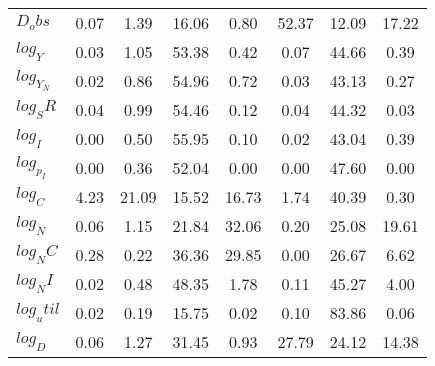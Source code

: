 \begin{center}
\begin{longtable}{lccccccc}
$D_obs     $	 & 	        0.07	 & 	        1.39	 & 	       16.06	 & 	        0.80	 & 	       52.37	 & 	       12.09	 & 	       17.22 \\ 
$log_Y     $	 & 	        0.03	 & 	        1.05	 & 	       53.38	 & 	        0.42	 & 	        0.07	 & 	       44.66	 & 	        0.39 \\ 
$log_Y_N   $	 & 	        0.02	 & 	        0.86	 & 	       54.96	 & 	        0.72	 & 	        0.03	 & 	       43.13	 & 	        0.27 \\ 
$log_SR    $	 & 	        0.04	 & 	        0.99	 & 	       54.46	 & 	        0.12	 & 	        0.04	 & 	       44.32	 & 	        0.03 \\ 
$log_I     $	 & 	        0.00	 & 	        0.50	 & 	       55.95	 & 	        0.10	 & 	        0.02	 & 	       43.04	 & 	        0.39 \\ 
$log_p_I   $	 & 	        0.00	 & 	        0.36	 & 	       52.04	 & 	        0.00	 & 	        0.00	 & 	       47.60	 & 	        0.00 \\ 
$log_C     $	 & 	        4.23	 & 	       21.09	 & 	       15.52	 & 	       16.73	 & 	        1.74	 & 	       40.39	 & 	        0.30 \\ 
$log_N     $	 & 	        0.06	 & 	        1.15	 & 	       21.84	 & 	       32.06	 & 	        0.20	 & 	       25.08	 & 	       19.61 \\ 
$log_NC    $	 & 	        0.28	 & 	        0.22	 & 	       36.36	 & 	       29.85	 & 	        0.00	 & 	       26.67	 & 	        6.62 \\ 
$log_NI    $	 & 	        0.02	 & 	        0.48	 & 	       48.35	 & 	        1.78	 & 	        0.11	 & 	       45.27	 & 	        4.00 \\ 
$log_util  $	 & 	        0.02	 & 	        0.19	 & 	       15.75	 & 	        0.02	 & 	        0.10	 & 	       83.86	 & 	        0.06 \\ 
$log_D     $	 & 	        0.06	 & 	        1.27	 & 	       31.45	 & 	        0.93	 & 	       27.79	 & 	       24.12	 & 	       14.38 \\ 
\end{longtable}
 \end{center}
